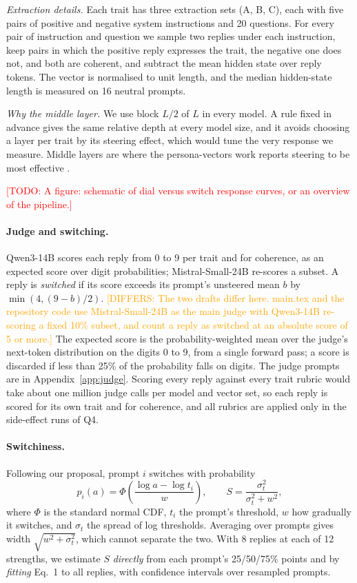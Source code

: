 \documentclass[11pt]{article}
\newcommand{\todo}[1]{\textcolor{red}{[TODO: #1]}}
\newcommand{\differ}[1]{\textcolor{orange}{[DIFFERS: #1]}}
\newcommand{\upd}[1]{{\color{blue}#1}}
\begin{document}
\upd{\emph{Extraction details.} Each trait has three extraction sets (A, B, C),
each with five pairs of positive and negative system instructions and 20
questions. For every pair of instruction and question we sample two replies
under each instruction, keep pairs in which the positive reply expresses the
trait, the negative one does not, and both are coherent, and subtract the mean
hidden state over reply tokens. The vector is normalised to unit length, and the
median hidden-state length is measured on 16 neutral prompts.

\emph{Why the middle layer.} We use block $L/2$ of $L$ in every model. A rule
fixed in advance gives the same relative depth at every model size, and it
avoids choosing a layer per trait by its steering effect, which would tune the
very response we measure. Middle layers are where the persona-vectors work
reports steering to be most effective \cite{chen2025persona}.}

\todo{A figure: schematic of dial versus switch response curves, or an overview
of the pipeline.}

\paragraph{Judge and switching.} Qwen3-14B scores each reply from 0 to 9 per trait and for coherence, as an expected score over digit probabilities; Mistral-Small-24B re-scores a subset. A reply is \emph{switched} if its score exceeds its prompt's unsteered mean $b$ by $\min(4,(9-b)/2)$.
\differ{The two drafts differ here. main.tex and the repository code use
Mistral-Small-24B as the main judge with Qwen3-14B re-scoring a fixed 10\%
subset, and count a reply as switched at an absolute score of 5 or more.}
\upd{The expected score is the probability-weighted mean over the judge's
next-token distribution on the digits 0 to 9, from a single forward pass; a
score is discarded if less than 25\% of the probability falls on digits. The
judge prompts are in Appendix~\ref{app:judge}. Scoring every reply against every
trait rubric would take about one million judge calls per model and vector set,
so each reply is scored for its own trait and for coherence, and all rubrics are
applied only in the side-effect runs of Q4.}

\paragraph{Switchiness.} Following our proposal, prompt $i$ switches with probability
\begin{equation}
p_i(a)=\Phi\!\left(\frac{\log a-\log t_i}{w}\right),\qquad
S=\frac{\sigma_t^2}{\sigma_t^2+w^2},
\end{equation}
where $\Phi$ is the standard normal CDF, $t_i$ the prompt's threshold, $w$ how gradually it switches, and $\sigma_t$ the spread of log thresholds. Averaging over prompts gives width $\sqrt{w^2+\sigma_t^2}$, which cannot separate the two. With 8 replies at each of 12 strengths, we estimate $S$ \emph{directly} from each prompt's 25/50/75\% points and by \emph{fitting} Eq.~1 to all replies, with confidence intervals over resampled prompts.
\end{document}
